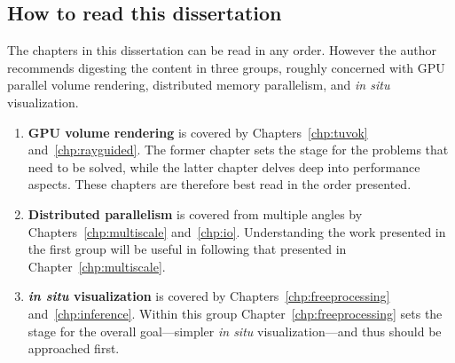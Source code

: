 \subsection{How to read this dissertation}

The chapters in this dissertation can be read in any order.  However
the author recommends digesting the content in three groups, roughly
concerned with GPU parallel volume rendering, distributed memory
parallelism, and
\textit{in situ} visualization.

\begin{enumerate}

  \item \textbf{GPU volume rendering} is covered by
  Chapters~\ref{chp:tuvok} and~\ref{chp:rayguided}.  The former chapter
  sets the stage for the problems that need to be solved, while the
  latter chapter delves deep into performance aspects.  These chapters
  are therefore best read in the order presented.

  \item \textbf{Distributed parallelism} is covered from multiple
  angles by Chapters~\ref{chp:multiscale} and~\ref{chp:io}.
  Understanding the work presented in the first group will be useful in
  following that presented in Chapter~\ref{chp:multiscale}.

  \item \textbf{\textit{in situ} visualization} is covered by
  Chapters~\ref{chp:freeprocessing} and~\ref{chp:inference}.  Within
  this group Chapter~\ref{chp:freeprocessing} sets the stage for the
  overall goal---simpler \textit{in situ} visualization---and thus
  should be approached first.

\end{enumerate}
